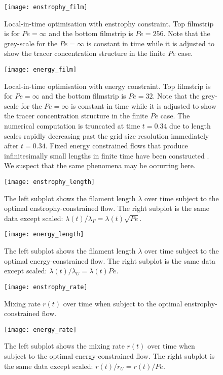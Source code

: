 \documentclass[12pt]{iopart}
\begin{document}
\begin{figure}
\texttt{[image: enstrophy\_film]}
\caption{Local-in-time optimisation with enstrophy constraint. Top filmstrip is for $Pe =\infty$ and the bottom filmstrip is $Pe=256$. Note that the grey-scale for the $Pe=\infty$ is constant in time while it is adjusted to show the tracer concentration structure in the finite $Pe$ case. }
\label{fig:enstrophy_film}
\end{figure}
%
\begin{figure}
\texttt{[image: energy\_film]}
\caption{Local-in-time optimisation with energy constraint. Top filmstrip is for $Pe = \infty$ and the bottom filmstrip is $Pe=32$. Note that the grey-scale for the $Pe=\infty$ is constant in time while it is adjusted to show the tracer concentration structure in the finite $Pe$ case. The numerical computation is truncated at time $t=0.34$ due to length scales rapidly decreasing past the grid size resolution immediately after $t=0.34$. Fixed energy constrained flows that produce infinitesimally small lengths in finite time have been constructed \cite{JMP2012}. We suspect that the same phenomena may be occurring here.}
\label{fig:energy_film}
\end{figure}
%
\begin{figure}
\texttt{[image: enstrophy\_length]}
\caption{The left subplot shows the filament length $\lambda$ over time subject to the optimal enstrophy-constrained flow. The right subplot is the same data except scaled: $\lambda(t)/\lambda_{\Gamma} = \lambda(t)\sqrt{Pe}$.}
\label{fig:enstrophy_length}
\end{figure}
%
\begin{figure}
\texttt{[image: energy\_length]}
\caption{The left subplot shows the filament length $\lambda$ over time subject to the optimal energy-constrained flow. The right subplot is the same data except scaled: $\lambda(t)/\lambda_{U} = \lambda(t) Pe$.}
\label{fig:energy_length}
\end{figure}
%
\begin{figure}
\centering
\texttt{[image: enstrophy\_rate]}
\caption{Mixing rate $r(t)$ over time when subject to the optimal enstrophy-constrained flow.}
\label{fig:enstrophy_rate}
\end{figure}
%
\begin{figure}
\centering
\texttt{[image: energy\_rate]}
\caption{The left subplot shows the mixing rate $r(t)$ over time when subject to the optimal energy-constrained flow. The right subplot is the same data except scaled: $r(t)/r_{U} = r(t)/Pe$.}
\label{fig:energy_rate}
\end{figure}
\end{document}
